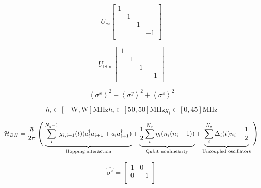 \begin{equation}
U_{cz}
\begin{bmatrix}
1 &  &  & \\
& 1 &  & \\
&  & 1 & \\
&  &  & -1\\
\end{bmatrix}
\end{equation}




\begin{equation}
U_{\textrm{fSim}}
\begin{bmatrix}
1 &  &   & \\
& 1 &   & \\
&  & 1  & \\
&  &  & -1\\
\end{bmatrix}
\end{equation}

\begin{equation}
\left< \sigma^{x} \right>^{2} + \left< \sigma^{y} \right>^{2} + \left< \sigma^{z} \right>^{2}
\end{equation}


\begin{equation}
h_{i} \in \left[ -\textrm{W}, \textrm{W} \right] \textrm{MHz}
h_{i} \in \left[ 50, 50 \right] \textrm{MHz}
g_{i} \in \left[ 0,  45 \right] \textrm{MHz}
\end{equation}



\begin{equation}
\mathcal{H}_{BH} =\frac{\hbar}{2 \pi} \left(\vphantom{\sum\limits_{i}^{N_{q}}}\right.
\underbrace{\sum\limits_{i}^{N_{q} - 1} g_{i,i+1}(t) (a_i^\dagger a_{i+1} + a_i a_{i+1}^\dagger)}_{\text{Hopping interaction}} +
\underbrace{\frac{1}{2} \sum\limits_{i}^{N_q} \eta_i (n_i (n_i-1))}_{\text{Qubit nonlinearity}} +
\underbrace{\sum\limits_{i}^{N_q} \Delta_i (t) n_i + \frac {1}{2}}_{\text{Uncoupled oscillators}}
\left.\vphantom{\sum\limits_{i}^{N_{q}}}\right)
\label{BH_Hamiltonian}
\end{equation}

\begin{equation}
\hat{\sigma^{z}}=
\begin{bmatrix}
1 & 0\\
0 & -1\\
\end{bmatrix}
\end{equation}

